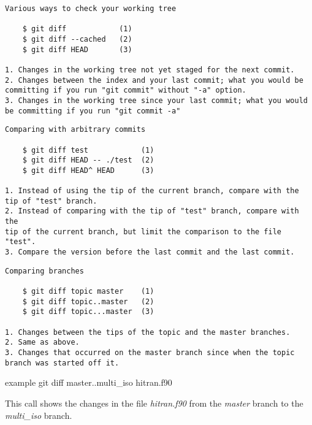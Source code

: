 \documentclass{beamer}
\begin{document}
\begin{frame}[fragile]
\footnotesize 
\begin{verbatim}
Various ways to check your working tree

    $ git diff            (1)
    $ git diff --cached   (2)
    $ git diff HEAD       (3)

1. Changes in the working tree not yet staged for the next commit.
2. Changes between the index and your last commit; what you would be
committing if you run "git commit" without "-a" option.
3. Changes in the working tree since your last commit; what you would 
be committing if you run "git commit -a"
\end{verbatim}
\end{frame}


\begin{frame}[fragile]
\footnotesize 
\begin{verbatim}
Comparing with arbitrary commits

    $ git diff test            (1)
    $ git diff HEAD -- ./test  (2)
    $ git diff HEAD^ HEAD      (3)

1. Instead of using the tip of the current branch, compare with the 
tip of "test" branch.
2. Instead of comparing with the tip of "test" branch, compare with the 
tip of the current branch, but limit the comparison to the file "test".
3. Compare the version before the last commit and the last commit.
\end{verbatim}
\end{frame}


\begin{frame}[fragile]
\footnotesize 
\begin{verbatim}
Comparing branches

    $ git diff topic master    (1)
    $ git diff topic..master   (2)
    $ git diff topic...master  (3)

1. Changes between the tips of the topic and the master branches.
2. Same as above.
3. Changes that occurred on the master branch since when the topic 
branch was started off it.
\end{verbatim}
\end{frame}

\begin{frame}

\begin{block}{example}
git diff master..multi\_iso hitran.f90 
\end{block}
This call shows the changes in the file \textit{hitran.f90} from the \textit{master} branch  to the \textit{multi\_iso} branch.
\end{frame}
\end{document}
